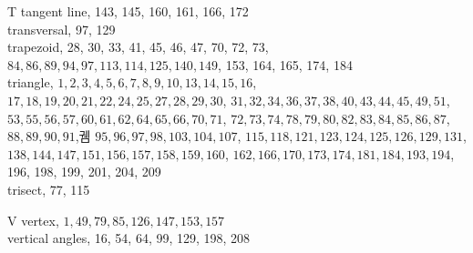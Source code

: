 \documentclass{article}
\begin{document}
T
tangent line, 143, 145, 160, 161, 166, 172\\
transversal, 97, 129\\
trapezoid, 28, 30, 33, 41, 45, 46, 47, 70, 72, 73, \(84,86,89,94,97,113,114,125,140,149\), 153, 164, 165, 174, 184\\
triangle, \(1,2,3,4,5,6,7,8,9,10,13,14,15,16\), \(17,18,19,20,21,22,24,25,27,28,29,30\), \(31,32,34,36,37,38,40,43,44,45,49,51\), \(53,55,56,57,60,61,62,64,65,66,70,71\), \(72,73,74,78,79,80,82,83,84,85,86,87\), \(88,89,90,91\),궴 \(95,96,97,98,103,104,107\), \(115,118,121,123,124,125,126,129,131\), \(138,144,147,151,156,157,158,159,160\), \(162,166,170,173,174,181,184,193,194\), 196, 198, 199, 201, 204, 209\\
trisect, 77, 115

V
vertex, \(1,49,79,85,126,147,153,157\)\\
vertical angles, 16, 54, 64, 99, 129, 198, 208
\end{document}
